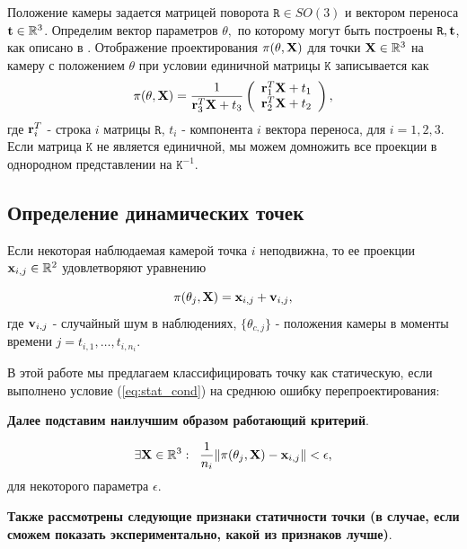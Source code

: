 \documentclass[conference]{IEEEtran}
\begin{document}
Положение камеры задается матрицей поворота $\mathtt{R} \in SO(3)$ и вектором переноса ${\bf t} \in \mathbb{R}^3$.  Определим вектор параметров $\theta,$ по которому могут быть построены $\mathtt{R}, {\bf t}$, как описано в \cite{}. Отображение проектирования $\pi(\theta, {\bf X})$ для точки ${\bf X} \in \mathbb{R}^3$ на камеру с положением $\theta$ при условии единичной матрицы $\mathtt{K}$ записывается как
\begin{equation}\label{eq:proj_fun}
\pi(\theta, {\bf X}) = 
\frac{1}{{\bf r}_3^T {\bf X} + t_3}
\left( 
\begin{array}{c}
 {\bf r}_1^T {\bf X} + t_1 \\
{\bf r}_2^T {\bf X} + t_2
\end{array}
\right),
\end{equation}
где ${\bf r}_i^T$ - строка $i$ матрицы $\mathtt{R}$, $t_i$ - компонента $i$ вектора переноса, для $i = 1,2,3.$ Если матрица $\mathtt{K}$ не является единичной, мы можем домножить все проекции в однородном представлении на $\mathtt{K}^{-1}$.

\subsection{Определение динамических точек}
Если некоторая наблюдаемая камерой точка $i$ неподвижна, то ее проекции ${\bf x}_{i,j} \in \mathbb{R}^2$ удовлетворяют уравнению

\begin{equation}
\label{eq:proj_stat}
\pi(\theta_j, {\bf X}) = {\bf x}_{i,j} + {\bf v}_{i,j},
\end{equation}
где ${\bf v}_{i,j}$ - случайный шум в наблюдениях, $\{ \theta_{c,j} \}$ - положения камеры в моменты времени $j =t_{i,1}, \ldots, t_{i,n_i}$. 

В этой работе мы предлагаем классифицировать точку как статическую, если выполнено условие (\ref{eq:stat_cond}) на среднюю ошибку перепроектирования:

{\bf Далее подставим наилучшим образом работающий критерий}.

\begin{equation}\label{eq:stat_cond}
\exists {\bf X} \in \mathbb{R}^3: \; \; \frac{1}{n_i} \|\pi(\theta_j, {\bf X}) - {\bf x}_{i,j} \| < \epsilon,
\end{equation}
для некоторого параметра $\epsilon$.

{\bf Также рассмотрены следующие признаки статичности точки (в случае, если сможем показать экспериментально, какой из признаков лучше)}.
\end{document}
